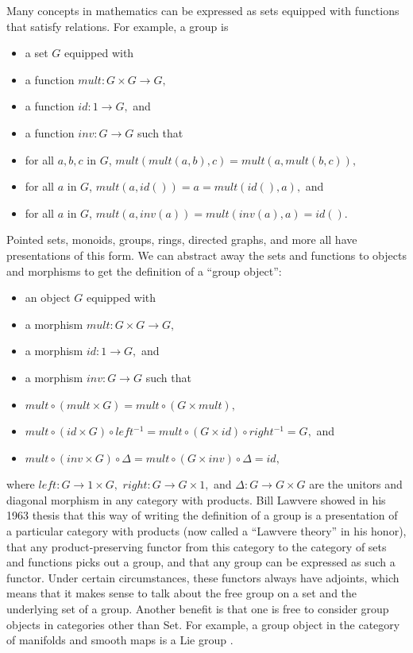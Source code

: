 \documentclass[12pt,twoside,openright]{report}
\newcommand{\maps}{\colon}
\begin{document}
Many concepts in mathematics can be expressed as sets equipped with functions that satisfy relations.  For example, a group is
\begin{itemize}
  \item a set $G$ equipped with
  \item a function $mult\maps G \times G \to G,$
  \item a function $id\maps 1 \to G,$ and
  \item a function $inv\maps G \to G$ such that
  \item for all $a, b, c$ in $G$, $mult(mult(a, b), c) = mult(a, mult(b, c)),$
  \item for all $a$ in $G$, $mult(a, id()) = a = mult(id(), a),$ and
  \item for all $a$ in $G$, $mult(a, inv(a)) = mult(inv(a), a) = id().$
\end{itemize}
Pointed sets, monoids, groups, rings, directed graphs, and more all have presentations of this form.  We can abstract away the sets and functions to objects and morphisms to get the definition of a ``group object'':
\begin{itemize}
  \item an object $G$ equipped with
  \item a morphism $mult\maps G \times G \to G,$
  \item a morphism $id\maps 1 \to G,$ and
  \item a morphism $inv\maps G \to G$ such that
  \item $mult \circ (mult \times G) = mult \circ (G \times mult),$
  \item $mult \circ (id \times G) \circ left^{-1} = mult \circ (G \times id) \circ right^{-1} = G,$ and
  \item $mult \circ (inv \times G) \circ \Delta = mult \circ (G \times inv) \circ \Delta = id,$
\end{itemize}
where $left\maps G \to 1 \times G,$ $right\maps G \to G \times 1,$ and $\Delta\maps G \to G \times G$ are the unitors and diagonal morphism in any category with products.  Bill Lawvere showed in his 1963 thesis \cite{Lawvere} that this way of writing the definition of a group is a presentation of a particular category with products (now called a ``Lawvere theory'' in his honor), that any product-preserving functor from this category to the category of sets and functions picks out a group, and that any group can be expressed as such a functor.  Under certain circumstances, these functors always have adjoints, which means that it makes sense to talk about the free group on a set and the underlying set of a group.  Another benefit is that one is free to consider group objects in categories other than Set.  For example, a group object in the category of manifolds and smooth maps is a Lie group \cite{nlabgroupobject}.
\end{document}
